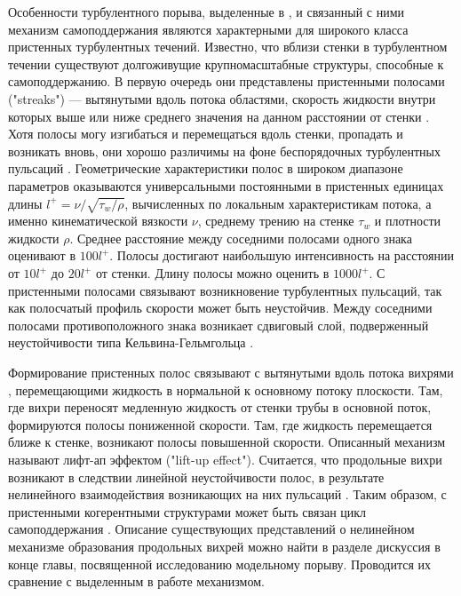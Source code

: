 Особенности турбулентного порыва, выделенные в \cite{Shimizu2009}, и связанный с ними механизм самоподдержания являются характерными для широкого класса пристенных турбулентных течений. Известно, что вблизи стенки в турбулентном течении существуют долгоживущие крупномасштабные структуры, способные к самоподдержанию. В первую очередь они представлены пристенными полосами ("streaks") --- вытянутыми вдоль потока областями, скорость жидкости внутри которых выше или ниже среднего значения на данном расстоянии от стенки \cite{Klebanoff1962}. Хотя полосы могу изгибаться и перемещаться вдоль стенки, пропадать и возникать вновь, они хорошо различимы на фоне беспорядочных турбулентных пульсаций \cite{Kline1967}. Геометрические характеристики полос в широком диапазоне параметров оказываются универсальными постоянными в пристенных единицах длины $l^+ = \nu / \sqrt{\tau_{w} / \rho}$, вычисленных по локальным характеристикам потока, а именно кинематической вязкости $\nu$, среднему трению на стенке $\tau_{w}$ и плотности жидкости $\rho$. Среднее расстояние между соседними полосами одного знака оценивают в $100 l^+$. Полосы достигают наибольшую интенсивность на расстоянии от $10 l^+$ до $20 l^+$ от стенки. Длину полосы можно оценить в $1000 l^+$. С пристенными полосами связывают возникновение турбулентных пульсаций, так как полосчатый профиль скорости может быть неустойчив. Между соседними полосами противоположного знака возникает сдвиговый слой, подверженный неустойчивости типа Кельвина-Гельмгольца \cite{}.

Формирование пристенных полос связывают с вытянутыми вдоль потока вихрями \cite{Blackwelder1979, Jeong1997}, перемещающими жидкость в нормальной к основному потоку плоскости. Там, где вихри переносят медленную жидкость от стенки трубы в основной поток, формируются полосы пониженной скорости. Там, где жидкость перемещается ближе к стенке, возникают полосы повышенной скорости. Описанный механизм называют лифт-ап эффектом ("lift-up effect"). Считается, что продольные вихри возникают в следствии линейной неустойчивости полос, в результате нелинейного взаимодействия возникающих на них пульсаций \cite{Hamilton1995, Schoppa2002, Kawahara2003}. Таким образом, с пристенными когерентными структурами может быть связан цикл самоподдержания \cite{Hamilton1995, Waleffe1997}. Описание существующих представлений о нелинейном механизме образования продольных вихрей можно найти в разделе дискуссия в конце главы, посвященной исследованию модельному порыву. Проводится их сравнение с выделенным в работе механизмом.   

